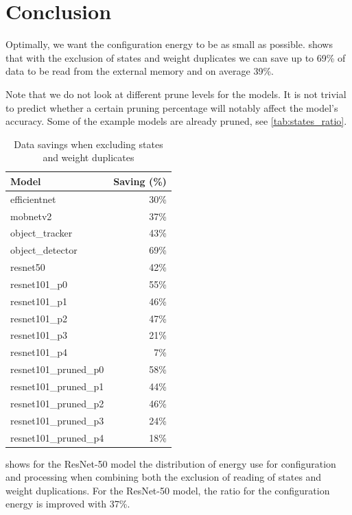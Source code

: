 \section{Conclusion}
Optimally, we want the configuration energy to be as small as possible.
 shows that with the exclusion of states and weight duplicates we can save up to 69\% of data to be read from the external memory and on average 39\%.

Note that we do not look at different prune levels for the models.
It is not trivial to predict whether a certain pruning percentage will notably affect the model's accuracy.
Some of the example models are already pruned, see \cref{tab:states_ratio}.

\begin{table}[hbtp]
\centering
\begin{tabular}{@{}lr@{}}
\toprule
\textbf{Model}          & \textbf{Saving (\%)} \\ \midrule
efficientnet            & 30\%                 \\
mobnetv2                & 37\%                 \\
object\_tracker         & 43\%                 \\
object\_detector        & 69\%                 \\
resnet50                & 42\%                 \\
resnet101\_p0           & 55\%                 \\
resnet101\_p1           & 46\%                 \\
resnet101\_p2           & 47\%                 \\
resnet101\_p3           & 21\%                 \\
resnet101\_p4           & 7\%                  \\
resnet101\_pruned\_p0   & 58\%                 \\
resnet101\_pruned\_p1   & 44\%                 \\
resnet101\_pruned\_p2   & 46\%                 \\
resnet101\_pruned\_p3   & 24\%                 \\
resnet101\_pruned\_p4   & 18\%                 \\ \bottomrule
\end{tabular}
\caption{Data savings when excluding states and weight duplicates}
\label{tab:savings}
\end{table}

 shows for the ResNet-50 model the distribution of energy use for configuration and processing when combining both the exclusion of reading of states and weight duplications.
For the ResNet-50 model, the ratio for the configuration energy is improved with 37\%.

